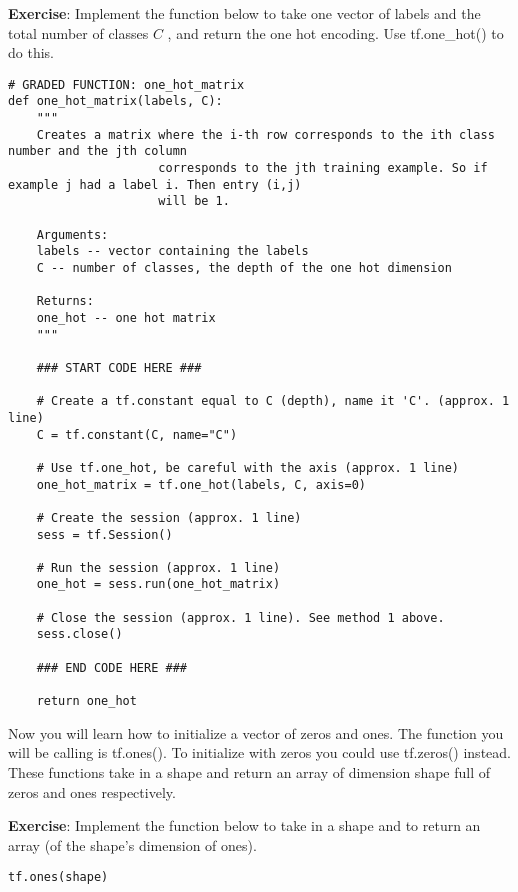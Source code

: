 {\textbf {Exercise}}: Implement the function below to take one vector of labels and the total number of classes  $C$ , and return the one hot encoding. Use tf.one\_hot() to do this.

\begin{verbatim} 
# GRADED FUNCTION: one_hot_matrix
def one_hot_matrix(labels, C):
    """
    Creates a matrix where the i-th row corresponds to the ith class number and the jth column
                     corresponds to the jth training example. So if example j had a label i. Then entry (i,j) 
                     will be 1. 
                     
    Arguments:
    labels -- vector containing the labels 
    C -- number of classes, the depth of the one hot dimension
    
    Returns: 
    one_hot -- one hot matrix
    """
    
    ### START CODE HERE ###
    
    # Create a tf.constant equal to C (depth), name it 'C'. (approx. 1 line)
    C = tf.constant(C, name="C")
    
    # Use tf.one_hot, be careful with the axis (approx. 1 line)
    one_hot_matrix = tf.one_hot(labels, C, axis=0)
    
    # Create the session (approx. 1 line)
    sess = tf.Session()
    
    # Run the session (approx. 1 line)
    one_hot = sess.run(one_hot_matrix)
    
    # Close the session (approx. 1 line). See method 1 above.
    sess.close()
    
    ### END CODE HERE ###
    
    return one_hot
\end{verbatim} 





Now you will learn how to initialize a vector of zeros and ones. The function you will be calling is tf.ones(). To initialize with zeros you could use tf.zeros() instead. These functions take in a shape and return an array of dimension shape full of zeros and ones respectively.

{\textbf {Exercise}}: Implement the function below to take in a shape and to return an array (of the shape's dimension of ones).
\begin{verbatim} 
tf.ones(shape)
\end{verbatim} 

